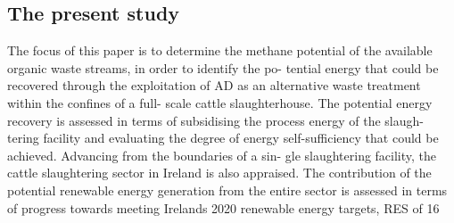 \subsection{The present study}
The focus of this paper is to determine the methane potential of
the available organic waste streams, in order to identify the po- tential energy that could be recovered through the exploitation of AD as an alternative waste treatment within the confines of a full- scale cattle slaughterhouse. The potential energy recovery is assessed in terms of subsidising the process energy of the slaugh- tering facility and evaluating the degree of energy self-sufficiency that could be achieved. Advancing from the boundaries of a sin- gle slaughtering facility, the cattle slaughtering sector in Ireland is also appraised. The contribution of the potential renewable energy generation from the entire sector is assessed in terms of progress towards meeting Irelands 2020 renewable energy targets, RES of 16%